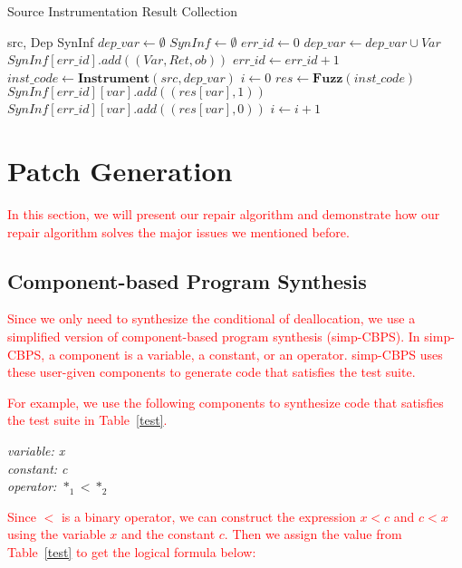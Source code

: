 \documentclass[a4paper,11pt,oneside,openany]{book}
\begin{document}
 \begin{algorithm}[t]
 \caption{Source Instrumentation Result Collection}
 \label{algo1}
 \begin{algorithmic}[1]
 \renewcommand{\algorithmicrequire}{\textbf{Input:}}
 \renewcommand{\algorithmicensure}{\textbf{Output:}}
 \REQUIRE src, Dep
 \ENSURE  SynInf
  \STATE $dep\_var \gets \emptyset$
  \STATE $SynInf \gets \emptyset$
  \STATE $err\_id \gets 0$
   \STATE $dep\_var \gets dep\_var \cup Var$
   \STATE $SynInf[err\_id].add((Var,Ret,ob))$
   \STATE $err\_id \gets err\_id + 1$
  \ENDFOR
  \STATE $inst\_code \gets \textbf{Instrument}(src, dep\_var)$
  \STATE $i \gets 0$
   \STATE $res \gets \textbf{Fuzz}(inst\_code)$
      \STATE $SynInf[err\_id][var].add((res[var],1))$
     \ELSE
      \STATE $SynInf[err\_id][var].add((res[var],0))$
     \ENDIF
     \ENDFOR
    \ENDFOR
   \STATE $i\gets i + 1$
  \ENDWHILE
 \end{algorithmic} 
 \end{algorithm}

\section{Patch Generation}
\label{patchgeneration}

\textcolor{red}{
In this section, we will present our repair algorithm and demonstrate how our repair algorithm solves the major issues we mentioned before.
}

\subsection{Component-based Program Synthesis}
\textcolor{red}{
Since we only need to synthesize the conditional of deallocation, we use a simplified version of component-based program synthesis (simp-CBPS). In simp-CBPS, a component is a variable, a constant, or an operator. simp-CBPS uses these user-given components to generate code that satisfies the test suite. }

\textcolor{red}{
For example, we use the following components to synthesize code that satisfies the test suite in Table~\ref{test}.
}

\begin{minipage}{\textwidth}
    \vspace{0.2cm}
    \textsl{\hspace{0.3cm}variable: x\\\hspace{0.3cm}constant: c\\\hspace{0.3cm}operator: $*_1<*_2$\\}
\end{minipage}
\textcolor{red}{
Since $<$ is a binary operator, we can construct the expression $x<c$ and $c<x$ using the variable $x$ and the constant $c$. Then we assign the value from Table~\ref{test} to get the logical formula below:
}
\end{document}
